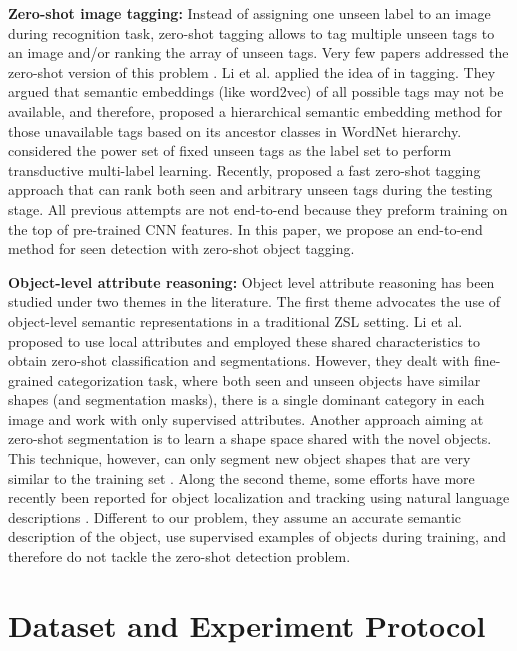 \documentclass[runningheads]{llncs}
\begin{document}
\textbf{Zero-shot image tagging:} Instead of assigning one unseen label to an image during recognition task, zero-shot tagging allows to tag multiple unseen tags to an image and/or ranking the array of unseen tags. Very few papers addressed the zero-shot version of this problem \cite{Li_tagging_2015,Fu_Transductive_2015,Zhang_2016_CVPR}. Li et al. \cite{Li_tagging_2015} applied the idea of \cite{norouzi_arXiv_2013} in tagging. They argued that semantic embeddings (like word2vec) of all possible tags may not be available, and therefore, proposed a hierarchical semantic embedding method for those unavailable tags based on its ancestor classes in WordNet hierarchy. \cite{Fu_Transductive_2015} considered the power set of fixed unseen tags as the label set to perform transductive multi-label learning. Recently, \cite{Zhang_2016_CVPR} proposed a fast zero-shot tagging approach that can rank both seen and arbitrary unseen tags during the testing stage. All previous attempts are not end-to-end because they preform training on the top of pre-trained CNN features. In this paper, we propose an end-to-end method for  seen detection with zero-shot object tagging.

\textbf{Object-level attribute reasoning:} 
Object level attribute reasoning has been studied under two themes in the literature. The first theme advocates the use of object-level semantic representations in a traditional ZSL setting. Li et al. \cite{li2014attributes} proposed to use local attributes and employed these shared characteristics to obtain zero-shot classification and segmentations. However, they dealt with fine-grained categorization task, where both seen and unseen objects have similar shapes (and segmentation masks), there is a single dominant category in each image and work with only supervised attributes. Another approach aiming at zero-shot segmentation is to learn a shape space shared with the novel objects. This technique, however, can only segment new object shapes that are very similar to the training set \cite{jetley2016straight}. Along the second theme, some efforts have more recently been reported for object localization and tracking using natural language descriptions \cite{hu2016natural,li2017tracking}. Different to our problem, they assume an accurate semantic description of the object, use supervised examples of objects during training, and therefore do not tackle the zero-shot detection problem. 



\section{Dataset and Experiment Protocol} \label{sec:dataset}
\end{document}
